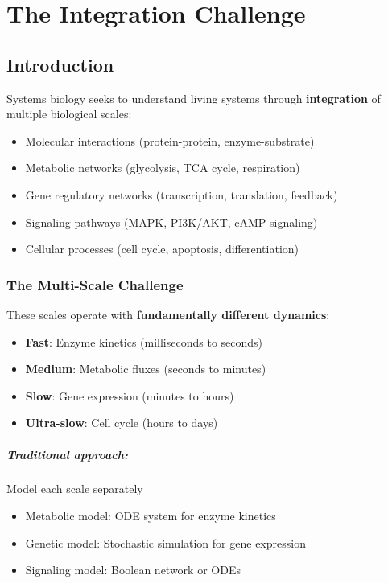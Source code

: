 \chapter{The Integration Challenge}
\label{ch:integration-challenge}

\section{Introduction}
\label{sec:integration-intro}

Systems biology seeks to understand living systems through \textbf{integration} of multiple biological scales:
\begin{itemize}
    \item Molecular interactions (protein-protein, enzyme-substrate)
    \item Metabolic networks (glycolysis, TCA cycle, respiration)
    \item Gene regulatory networks (transcription, translation, feedback)
    \item Signaling pathways (MAPK, PI3K/AKT, cAMP signaling)
    \item Cellular processes (cell cycle, apoptosis, differentiation)
\end{itemize}

\subsection{The Multi-Scale Challenge}
\label{subsec:multiscale-challenge}

These scales operate with \textbf{fundamentally different dynamics}:
\begin{itemize}
    \item \textbf{Fast}: Enzyme kinetics (milliseconds to seconds)
    \item \textbf{Medium}: Metabolic fluxes (seconds to minutes)
    \item \textbf{Slow}: Gene expression (minutes to hours)
    \item \textbf{Ultra-slow}: Cell cycle (hours to days)
\end{itemize}

\paragraph{Traditional approach:} Model each scale separately
\begin{itemize}
    \item Metabolic model: ODE system for enzyme kinetics
    \item Genetic model: Stochastic simulation for gene expression
    \item Signaling model: Boolean network or ODEs
\end{itemize}

